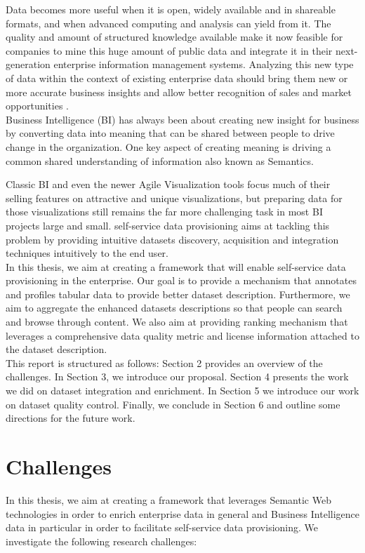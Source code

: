 \documentclass[onecolumn, crcready]{iosart2c}
\begin{document}
Data becomes more useful when it is open, widely available and in shareable formats, and when advanced computing and analysis can yield from it. The quality and amount of structured knowledge available make it now feasible for companies to mine this huge amount of public data and integrate it in their next-generation enterprise information management systems. Analyzing this new type of data within the context of existing enterprise data should bring them new or more accurate business insights and allow better recognition of sales and market opportunities \cite{bigData}.\\

Business Intelligence (BI) has always been about creating new insight for business by converting data into meaning that can be shared between people to drive change in the organization. One key aspect of creating meaning is driving a common shared understanding of information also known as Semantics.

Classic BI and even the newer Agile Visualization tools focus much of their selling features on attractive and unique visualizations, but preparing data for those visualizations still remains the far more challenging task in most BI projects large and small. self-service data provisioning aims at tackling this problem by providing intuitive datasets discovery, acquisition and integration techniques intuitively to the end user.\\

In this thesis, we aim at creating a framework that will enable self-service data provisioning in the enterprise. Our goal is to provide a mechanism that annotates and profiles tabular data to provide better dataset description. Furthermore, we aim to aggregate the enhanced datasets descriptions so that people can search and browse through content. We also aim at providing ranking mechanism that leverages a comprehensive data quality metric and license information attached to the dataset description.\\

This report is structured as follows: Section 2 provides an overview of the challenges. In Section 3, we introduce our proposal. Section 4 presents the work we did on dataset integration and enrichment. In Section 5 we introduce our work on dataset quality control. Finally, we conclude in Section 6 and outline some directions for the future work.


\section{Challenges}
In this thesis, we aim at creating a framework that leverages Semantic Web technologies in order to enrich enterprise data in general and Business Intelligence data in particular in order to facilitate self-service data provisioning. We investigate the following research challenges:
\end{document}
